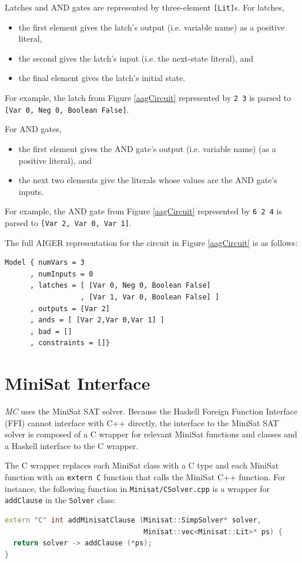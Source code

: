 \documentclass[12pt,a4paper,twoside,openright]{report}
\begin{document}
{{Latches and AND gates are represented by three-element \verb,[Lit],s. For latches,
\begin{itemize}
\item the first element gives the latch's output (i.e. variable name)
as a positive literal,
\item the second gives the latch's input (i.e. the next-state literal), and
\item the final element gives the latch's initial state.
\end{itemize}
For example, the latch from Figure \ref{aagCircuit} represented by \verb,2 3, is parsed
to \verb.[Var 0, Neg 0, Boolean False]..

For AND gates,
\begin{itemize}
\item the first element gives the AND gate's output (i.e. variable name)
(as a positive literal), and
\item the next two elements give the literals whose values are the AND gate's inputs.
\end{itemize}
For example, the AND gate from Figure \ref{aagCircuit} represented by \verb,6 2 4, is
parsed to \verb.[Var 2, Var 0, Var 1]..

The full AIGER representation for the circuit in Figure \ref{aagCircuit} is
as follows:
\begin{lstlisting}
Model { numVars = 3
      , numInputs = 0
      , latches = [ [Var 0, Neg 0, Boolean False]
                  , [Var 1, Var 0, Boolean False] ]
      , outputs = [Var 2]
      , ands = [ [Var 2,Var 0,Var 1] ]
      , bad = []
      , constraints = []}
\end{lstlisting}

\section{MiniSat Interface}
\label{impl:minisat}

\emph{MC} uses the MiniSat SAT solver.
Because the Haskell Foreign Function Interface (FFI) cannot interface with C++ directly,
the interface to the MiniSat SAT solver is composed of a C wrapper for relevant
MiniSat functions and classes and a Haskell interface to the C wrapper.

The C wrapper replaces each MiniSat class with a C type and each MiniSat function with
an \verb,extern C, function that calls the MiniSat C++ function.
For instance, the following function
in \verb,Minisat/CSolver.cpp, is a wrapper for \verb,addClause, in the \verb,Solver,
class:
\begin{lstlisting}[language = C++]
extern "C" int addMinisatClause (Minisat::SimpSolver* solver,
                                 Minisat::vec<Minisat::Lit>* ps) {
  return solver -> addClause (*ps);
}
\end{lstlisting}

}}
\end{document}
